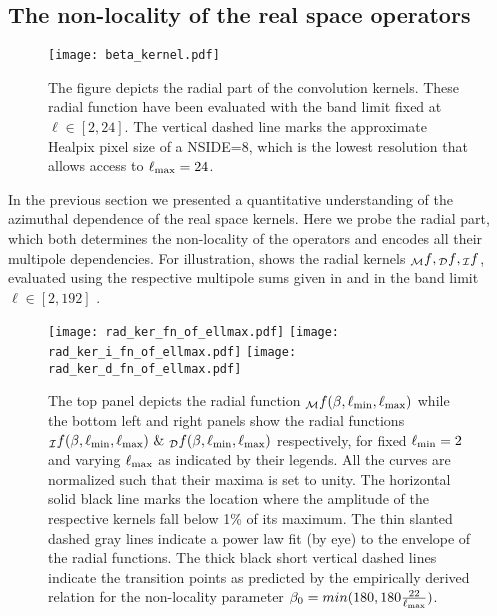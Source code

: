 \subsection{The non-locality of the real space operators} \label{sec:radial_locality}
%
\begin{figure}[t]
\centering
\texttt{[image: beta\_kernel.pdf]}
\caption{The figure depicts the radial part of the convolution kernels. These radial function have been evaluated with the band limit fixed at $\ell \in [2,24]$. The vertical dashed line marks the approximate Healpix pixel size of a NSIDE=8, which is the lowest resolution that allows access to $\ell_{\rm max}=24$.}
\label{fig:beta_kernel}
\end{figure}
%
In the previous section we presented a quantitative understanding of the  azimuthal dependence of the real space kernels.  Here we probe the radial part, which both  determines the non-locality of the operators and encodes all their multipole dependencies. For illustration,  shows the radial kernels ${_{\mathcal{M}}f}, {_{\mathcal{D}}f},{_{\mathcal{I}}f}$, evaluated using the respective multipole sums given in  and  in the band limit $\ell \in [2,192]$ . 
%
\begin{figure}[t]
\texttt{[image: rad\_ker\_fn\_of\_ellmax.pdf]}\hfill
\texttt{[image: rad\_ker\_i\_fn\_of\_ellmax.pdf]}\hfill
\texttt{[image: rad\_ker\_d\_fn\_of\_ellmax.pdf]}
\caption{The top panel depicts the radial function  ${_{\mathcal{M}}f}(\beta,\ell_{\rm min},\ell_{\rm max})$ while the bottom left and right panels show the radial functions ${}_{\mathcal{I}}f(\beta,\ell_{\rm min},\ell_{\rm max}) ~\&~ {}_{\mathcal{D}}f(\beta,\ell_{\rm min},\ell_{\rm max})$ respectively, for fixed $\ell_{\rm min}=2$ and varying $\ell_{\rm max}$ as indicated by their legends. All the curves are normalized such that their maxima is set to unity. The horizontal solid black line marks the location where the amplitude of the respective kernels fall below 1\% of its maximum. The thin slanted dashed gray lines indicate a power law fit (by eye) to the envelope of the radial functions. The thick black short vertical dashed lines indicate the transition points as predicted by the empirically derived relation for the non-locality parameter $\beta_0=min(180,180 \frac{22}{\ell_{\rm max}})$.}
\label{fig:rad_ker_decay}
\end{figure}
%

